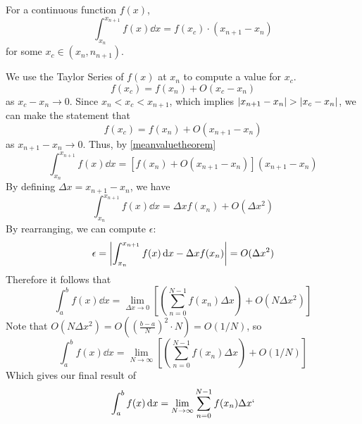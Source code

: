 \documentclass{article}
\begin{document}
\begin{theorem}
    For a continuous function $f(x)$,
    \begin{equation}\label{meanvaluetheorem}
        \int_{x_n}^{x_{n+1}} f(x) \dd{x} = f(x_c) \cdot (x_{n+1} - x_n)
    \end{equation}
    for some $x_c\in (x_n, n_{n+1})$.
\end{theorem}
\noindent We use the Taylor Series of $f(x)$ at $x_n$ to compute a value for $x_c$.
\[ f(x_c) = f(x_n) + O(x_c - x_n) \]
as $x_c - x_n \to 0$. Since $x_n < x_c < x_{n+1}$, which implies $\abs{x_{n+1} - x_n} > \abs{x_c - x_n}$, we can make the statement that
\[ f(x_c) = f(x_n) + O(x_{n+1} - x_n) \]
as $x_{n+1} - x_n \to 0$. Thus, by \eqref{meanvaluetheorem}
\[ \int_{x_n}^{x_{n+1}} f(x) \dd{x} = \left[ f(x_n) + O(x_{n+1} - x_n) \right] (x_{n+1} - x_n) \]
By defining $\Delta x = x_{n+1} - x_n$, we have
\begin{equation}
    \int_{x_n}^{x_{n+1}} f(x) \dd{x} = \Delta x f(x_n) + O(\Delta x ^ 2)
\end{equation}
By rearranging, we can compute $\epsilon$:
\[ \epsilon = \abs{\int_{x_n}^{x_{n+1}} f(x) \dd{x} - \Delta x f(x_n)} = O(\Delta x ^ 2) \]
Therefore it follows that
\[ \int_{a}^{b} f(x) \dd{x} = \lim_{\Delta x \to 0} \left[ \left( \sum_{n=0}^{N-1} f(x_n) \Delta x \right) + O(N\Delta x^2) \right] \]
Note that $O(N\Delta x^2) = O((\frac{b-a}{N})^2 \cdot N) = O(1/N)$, so
\[ \int_{a}^{b} f(x) \dd{x} = \lim_{N \to \infty} \left[ \left( \sum_{n=0}^{N-1} f(x_n) \Delta x \right) + O(1/N) \right] \]
Which gives our final result of
\begin{equation}\label{definiteintegral}
    \int_{a}^{b} f(x) \dd{x} = \lim_{N \to \infty} \sum_{n=0}^{N-1} f(x_n) \Delta x`
\end{equation}
\end{document}

